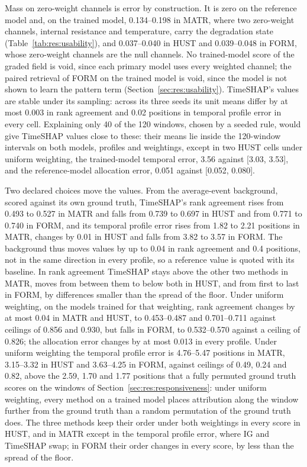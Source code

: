 \documentclass{article}
\begin{document}
Mass on zero-weight channels is error by construction. It is zero on the reference model and, on the trained model, 0.134--0.198 in MATR, where two zero-weight channels, internal resistance and temperature, carry the degradation state (Table~\ref{tab:res:usability}), and 0.037--0.040 in HUST and 0.039--0.048 in FORM, whose zero-weight channels are the null channels. No trained-model score of the graded field is void, since each primary model uses every weighted channel; the paired retrieval of FORM on the trained model is void, since the model is not shown to learn the pattern term (Section~\ref{sec:res:usability}). TimeSHAP's values are stable under its sampling: across its three seeds its unit means differ by at most 0.003 in rank agreement and 0.02 positions in temporal profile error in every cell. Explaining only 40 of the 120 windows, chosen by a seeded rule, would give TimeSHAP values close to these: their means lie inside the 120-window intervals on both models, profiles and weightings, except in two HUST cells under uniform weighting, the trained-model temporal error, 3.56 against [3.03, 3.53], and the reference-model allocation error, 0.051 against [0.052, 0.080].

Two declared choices move the values. From the average-event background, scored against its own ground truth, TimeSHAP's rank agreement rises from 0.493 to 0.527 in MATR and falls from 0.739 to 0.697 in HUST and from 0.771 to 0.740 in FORM, and its temporal profile error rises from 1.82 to 2.21 positions in MATR, changes by 0.01 in HUST and falls from 3.82 to 3.57 in FORM. The background thus moves values by up to 0.04 in rank agreement and 0.4 positions, not in the same direction in every profile, so a reference value is quoted with its baseline. In rank agreement TimeSHAP stays above the other two methods in MATR, moves from between them to below both in HUST, and from first to last in FORM, by differences smaller than the spread of the floor. Under uniform weighting, on the models trained for that weighting, rank agreement changes by at most 0.04 in MATR and HUST, to 0.453--0.487 and 0.701--0.711 against ceilings of 0.856 and 0.930, but falls in FORM, to 0.532--0.570 against a ceiling of 0.826; the allocation error changes by at most 0.013 in every profile. Under uniform weighting the temporal profile error is 4.76--5.47 positions in MATR, 3.15--3.32 in HUST and 3.63--4.25 in FORM, against ceilings of 0.49, 0.24 and 0.82, above the 2.59, 1.70 and 1.77 positions that a fully permuted ground truth scores on the windows of Section~\ref{sec:res:responsiveness}: under uniform weighting, every method on a trained model places attribution along the window further from the ground truth than a random permutation of the ground truth does. The three methods keep their order under both weightings in every score in HUST, and in MATR except in the temporal profile error, where IG and TimeSHAP swap; in FORM their order changes in every score, by less than the spread of the floor.
\end{document}

